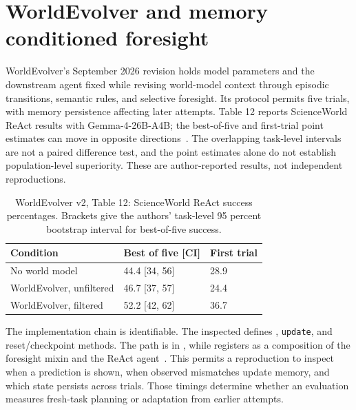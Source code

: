 \section{WorldEvolver and memory conditioned foresight}
\label{sec:C10:worldevolver}
WorldEvolver's September 2026 revision holds model parameters and the downstream agent fixed while revising world-model context through episodic transitions, semantic rules, and selective foresight. Its protocol permits five trials, with memory persistence affecting later attempts. Table 12 reports ScienceWorld ReAct results with Gemma-4-26B-A4B; the best-of-five and first-trial point estimates can move in opposite directions~\cite{rewrite_worldevolver2026}. The overlapping task-level intervals are not a paired difference test, and the point estimates alone do not establish population-level superiority. These are author-reported results, not independent reproductions.

{\small\setlength{\tabcolsep}{3pt}
\begin{table}[!htbp]
\centering
\caption{WorldEvolver v2, Table 12: ScienceWorld ReAct success percentages. Brackets give the authors' task-level 95 percent bootstrap interval for best-of-five success.}\label{tab:C10:reported}
\begin{tabular}{L{40mm}L{37mm}L{29mm}}

\toprule Condition & Best of five [CI] & First trial\\\midrule
No world model & 44.4 [34, 56] & 28.9\\
WorldEvolver, unfiltered & 46.7 [37, 57] & 24.4\\
WorldEvolver, filtered & 52.2 [42, 62] & 36.7\\
\bottomrule
\end{tabular}
\end{table}
}

The implementation chain is identifiable. The inspected  defines , \texttt{update}, and reset/checkpoint methods. The  path is in , while  registers  as a composition of the foresight mixin and the ReAct agent~\cite{rewrite_worldevolver_repo}. This permits a reproduction to inspect when a prediction is shown, when observed mismatches update memory, and which state persists across trials. Those timings determine whether an evaluation measures fresh-task planning or adaptation from earlier attempts.

